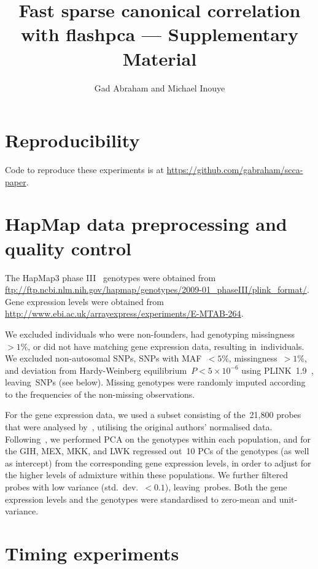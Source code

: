 \documentclass[a4paper,12pt]{article}
\author{Gad Abraham and Michael Inouye}
\title{Fast sparse canonical correlation with flashpca --- Supplementary
Material}
\begin{document}
\maketitle

\section{Reproducibility}

Code to reproduce these experiments is at
\url{https://github.com/gabraham/scca-paper}.

\section{HapMap data preprocessing and quality control}

The HapMap3 phase III~\citep{hapmap2010} genotypes were obtained from
\url{ftp://ftp.ncbi.nlm.nih.gov/hapmap/genotypes/2009-01_phaseIII/plink_format/}.
Gene expression levels were obtained from
\url{http://www.ebi.ac.uk/arrayexpress/experiments/E-MTAB-264}.

We excluded individuals who were non-founders, had genotyping
missingness~${>}1\%$, or did not have matching gene expression data,
resulting in~\nindiv individuals. We excluded non-autosomal SNPs, SNPs
with MAF~${<}5\%$, missingness~${>}1\%$, and deviation from Hardy-Weinberg
equilibrium~$P{<}5\times10^{-6}$ using PLINK~1.9~\citep{purcell2007,Chang2015},
leaving~\nsnps SNPs (see below). Missing genotypes were randomly imputed
according to the frequencies of the non-missing observations.

For the gene expression data, we used a subset consisting of the~21,800 probes
that were analysed by~\citep{Stranger2012}, utilising the original authors'
normalised data. Following~\citep{Stranger2012}, we performed PCA on the
genotypes within each population, and for the GIH, MEX, MKK, and LWK regressed
out~10 PCs of the genotypes (as well as intercept) from the corresponding gene
expression levels, in order to adjust for the higher levels of admixture within
these populations.  We further filtered probes with low variance
(std.~dev.~${<}0.1$), leaving~\ngenes probes. Both the gene expression levels and
the genotypes were standardised to zero-mean and unit-variance.

\section{Timing experiments}
\end{document}
